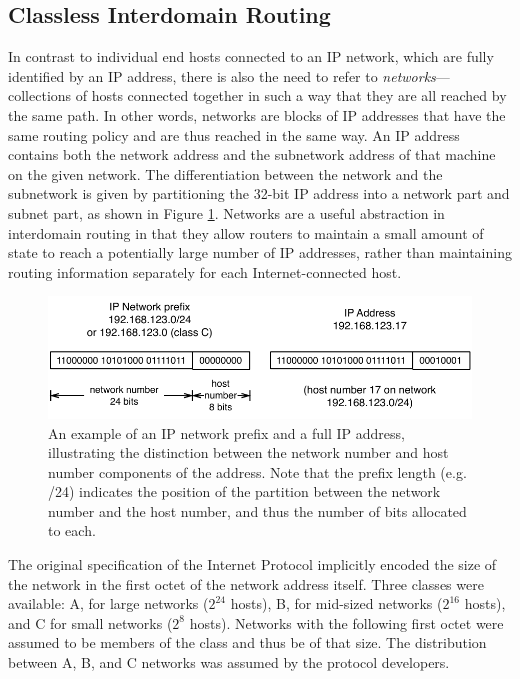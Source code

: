 
\subsection{Classless Interdomain Routing}

In contrast to individual end hosts connected to an IP network, which are fully identified by an IP address, there is also the need to refer to \emph{networks}---collections of hosts connected together in such a way that they are all reached by the same path. In other words, networks are blocks of IP addresses that have the same routing policy and are thus reached in the same way. An IP address contains both the network address and the subnetwork address of that machine on the given network. The differentiation between the network and the subnetwork is given by partitioning the 32-bit IP address into a network part and subnet part, as shown in Figure \ref{fig:ip_prefix_address}. Networks are a useful abstraction in interdomain routing in that they allow routers to maintain a small amount of state to reach a potentially large number of IP addresses, rather than maintaining routing information separately for each Internet-connected host. 

\begin{figure}[h]
\begin{centering}
\includegraphics[width=6in]{static_figures/prefix_address.pdf}
\caption[An example of an IP network prefix and a full IP address]{An example of an IP network prefix and a full IP address, illustrating the distinction between the network number and host number components of the address. Note that the prefix length (e.g. /24) indicates the position of the partition between the network number and the host number, and thus the number of bits allocated to each.}
\label{fig:ip_prefix_address}
\end{centering}
\end{figure}

The original specification of the Internet Protocol implicitly encoded the size of the network in the first octet of the network address itself. Three classes were available: A, for large networks ($2^{24}$ hosts), B, for mid-sized networks ($2^{16}$ hosts), and C for small networks ($2^{8}$ hosts). Networks with the following first octet were assumed to be members of the class and thus be of that size. The distribution between A, B, and C networks was assumed by the protocol developers.

